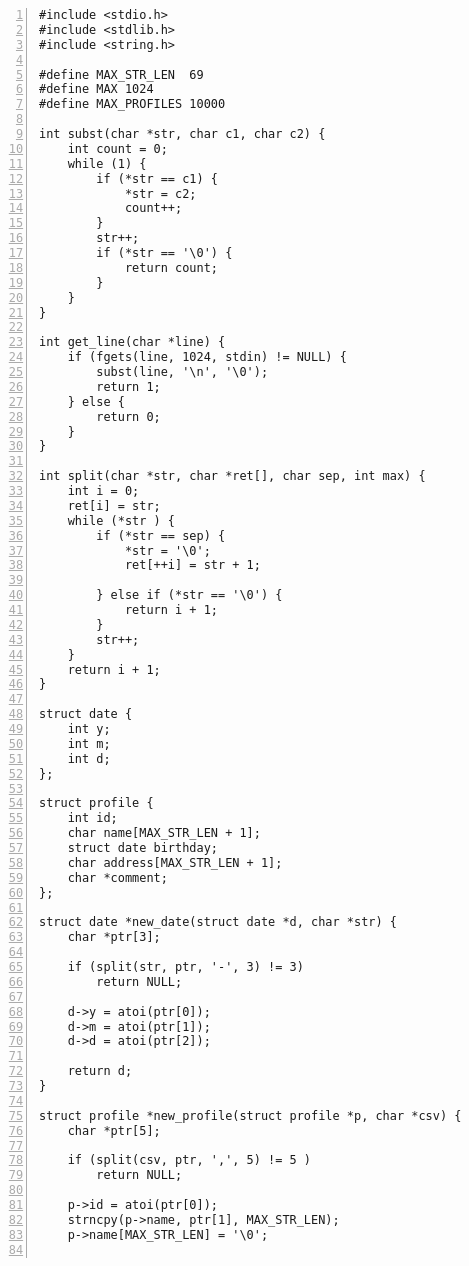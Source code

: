 \begin{Verbatim}[numbers=left, xleftmargin=10mm, numbersep=6pt,
                    fontsize=\small, baselinestretch=0.8]
#include <stdio.h>
#include <stdlib.h>
#include <string.h>

#define MAX_STR_LEN  69
#define MAX 1024
#define MAX_PROFILES 10000

int subst(char *str, char c1, char c2) {
    int count = 0;
    while (1) {
        if (*str == c1) {
            *str = c2;
            count++;
        }
        str++;
        if (*str == '\0') {
            return count;
        }
    }
}

int get_line(char *line) {
    if (fgets(line, 1024, stdin) != NULL) {
        subst(line, '\n', '\0');
        return 1;
    } else {
        return 0;
    }
}

int split(char *str, char *ret[], char sep, int max) {
    int i = 0;
    ret[i] = str;
    while (*str ) {
        if (*str == sep) {
            *str = '\0';
            ret[++i] = str + 1;
            
        } else if (*str == '\0') {
            return i + 1;
        }
        str++;
    }
    return i + 1;
}

struct date {
    int y;
    int m;
    int d;
};

struct profile {
    int id;
    char name[MAX_STR_LEN + 1];
    struct date birthday;
    char address[MAX_STR_LEN + 1];
    char *comment;
};

struct date *new_date(struct date *d, char *str) {
    char *ptr[3];

    if (split(str, ptr, '-', 3) != 3)
        return NULL;

    d->y = atoi(ptr[0]);
    d->m = atoi(ptr[1]);
    d->d = atoi(ptr[2]);

    return d;
}

struct profile *new_profile(struct profile *p, char *csv) {
    char *ptr[5];

    if (split(csv, ptr, ',', 5) != 5 )
        return NULL;

    p->id = atoi(ptr[0]);
    strncpy(p->name, ptr[1], MAX_STR_LEN);
    p->name[MAX_STR_LEN] = '\0';


\end{Verbatim}
